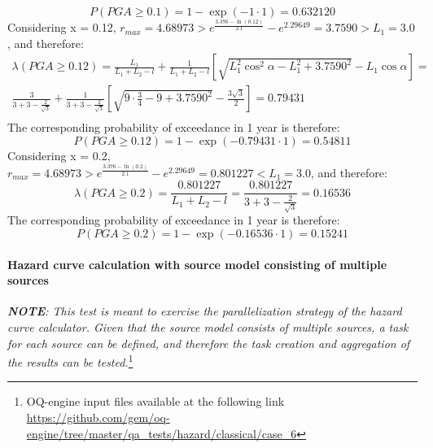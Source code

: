 \begin{equation}
P(PGA \geq 0.1) = 1 - \exp(-1\cdot 1) = 0.632120
\end{equation}
Considering x = 0.12, $r_{max} = 4.68973 > e^{\frac{3.376 - \ln(0.12)}{2.1}} - e^{2.29649} = 3.7590 > L_{1} = 3.0$, and therefore:
\begin{eqnarray}
\lambda(PGA \geq 0.12) = \frac{L_{1}}{L_{1}+L_{2}-l} +
\frac{1}{L_{1}+L_{2}-l}\left[ \sqrt{L_{1}^{2}\cos^{2}\alpha - L_{1}^{2} +
3.7590^{2}}-L_{1}\cos\alpha \right]=\nonumber \\
\frac{3}{3+3-\frac{2}{\sqrt{3}}} + \frac{1}{3+3-\frac{2}{\sqrt{3}}}\left[
\sqrt{9\cdot\frac{3}{4} - 9 + 3.7590^{2}} -\frac{3\sqrt{3}}{2}\right] = 0.79431
\nonumber \\
\end{eqnarray}
The corresponding probability of exceedance in 1 year is therefore:
\begin{equation}
P(PGA\geq0.12) = 1 -\exp(-0.79431 \cdot 1) = 0.54811
\end{equation}
Considering x = 0.2, $r_{max} = 4.68973 > e^{\frac{3.376 - \ln(0.2)}{2.1}} - e^{2.29649} = 0.801227 < L_{1} = 3.0$, and therefore:
\begin{equation}
\lambda(PGA \geq 0.2) = \frac{0.801227}{L_{1} + L_{2} - l} = \frac{0.801227}{3 + 3 - \frac{2}{\sqrt{3}}} = 0.16536
\end{equation}
The corresponding probability of exceedance in 1 year is therefore:
\begin{equation}
P(PGA \geq 0.2) = 1 - \exp(- 0.16536 \cdot 1) = 0.15241
\end{equation}
%
\clearpage
%
\paragraph{Hazard curve calculation with source model consisting of
multiple sources} 

\textit{\textbf{NOTE}: This test is meant to exercise the
    parallelization strategy of the hazard curve calculator. 
    Given that the source model consists of multiple sources, a
    task for each source can be defined, and therefore the task creation and
    aggregation of the results can be tested.}\footnote{
    OQ-engine input files available at the following link
    \url{https://github.com/gem/oq-engine/tree/master/qa_tests/hazard/classical/case_6}}

